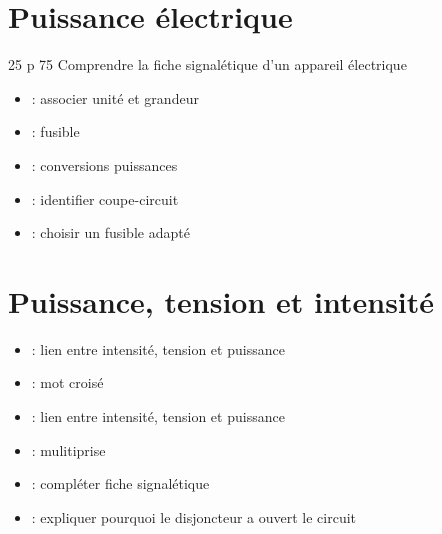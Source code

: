 \documentclass[12pt,a4paper]{article}
\date{}
\title{}
\begin{document}
	
	




\section{Puissance électrique}

\begin{myact}{25 p 75}
	Comprendre la fiche signalétique d'un appareil électrique
\end{myact}




\begin{myexos}
	\begin{itemize}
		\item {} : associer unité et grandeur
		\item {} : fusible
		\item {} : conversions puissances
		\item {} : identifier coupe-circuit
		\item {} : choisir un fusible adapté
	\end{itemize}
	
\end{myexos}



\section{Puissance, tension et intensité}



\begin{myexos}
	\begin{itemize}
		\item {} : lien entre intensité, tension et puissance
		\item {} : mot croisé
		\item {} : lien entre intensité, tension et puissance
		\item {} : mulitiprise
		\item {} : compléter fiche signalétique
		\item {} : expliquer pourquoi le disjoncteur a ouvert le circuit
	\end{itemize}
	
\end{myexos}
\end{document}
